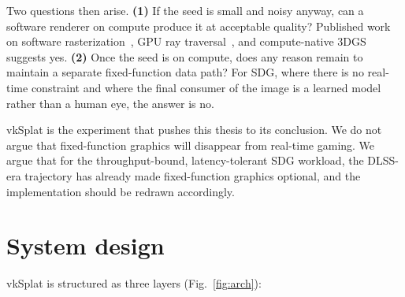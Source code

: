 \documentclass[10pt,journal]{IEEEtran}
\begin{document}
Two questions then arise. \textbf{(1)} If the seed is small and noisy
anyway, can a software renderer on compute produce it at acceptable
quality? Published work on software rasterization~\cite{laine2011software},
GPU ray traversal~\cite{aila2009understanding}, and compute-native 3DGS
~\cite{kerbl20233dgs} suggests yes. \textbf{(2)} Once the seed is on
compute, does any reason remain to maintain a separate fixed-function
data path? For SDG, where there is no real-time constraint and where
the final consumer of the image is a learned model rather than a human
eye, the answer is no.

vkSplat is the experiment that pushes this thesis to its conclusion.
We do not argue that fixed-function graphics will disappear from
real-time gaming. We argue that for the throughput-bound,
latency-tolerant SDG workload, the DLSS-era trajectory has already made
fixed-function graphics optional, and the implementation should be
redrawn accordingly.

\section{System design}\label{sec:design}

vkSplat is structured as three layers (Fig.~\ref{fig:arch}):
\end{document}
